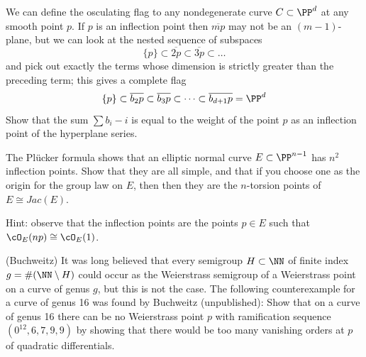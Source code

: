 \begin{exercise}
We can define the osculating flag to any nondegenerate curve $C \subset \PP^d$ at any smooth point $p$. If $p$ is an inflection point then $\overline{mp}$ may not be an $(m-1)$-plane, but we can look at the nested sequence of subspaces
$$
\{p\} \subset \overline{2p} \subset \overline{3p} \subset \dots 
$$
and pick out exactly the terms whose dimension is strictly greater than the preceding term; this gives a complete flag
$$
\{p\} \subset \overline{b_2p} \subset \overline{b_3p} \subset \dots \subset \overline{b_{d+1}p} = \PP^d
$$
Show that the sum $\sum b_i - i$ is equal to the weight of the point $p$ as an inflection point of the hyperplane series.
\end{exercise}


\begin{exercise}
The Pl\"ucker formula shows that an elliptic normal curve $E\subset \PP^{n-1}$ has $n^2$ inflection points. Show that they are
all simple, and that if you choose one as the origin for the group law on $E$, then 
then they are the $n$-torsion points of  $E \cong Jac(E)$.

Hint: observe that the inflection points are the points $p \in E$ such that $\cO_E(np) \cong \cO_E(1)$.
\end{exercise}

\begin{exercise}(Buchweitz)
It was long believed that every semigroup $H \subset \NN$ of finite index $g = \#(\NN \setminus H)$ could occur as the Weierstrass semigroup of a Weierstrass
point on a curve of genus $g$, but this is not the case. The following counterexample for a curve of genus 16 was found by Buchweitz (unpublished): Show that on a curve of genus 16 there can be no Weierstrass point $p$ with ramification sequence
$(0^{12}, 6,7,9,9)$ by showing that there would be too many vanishing orders at $p$ of quadratic differentials.
 \end{exercise}

